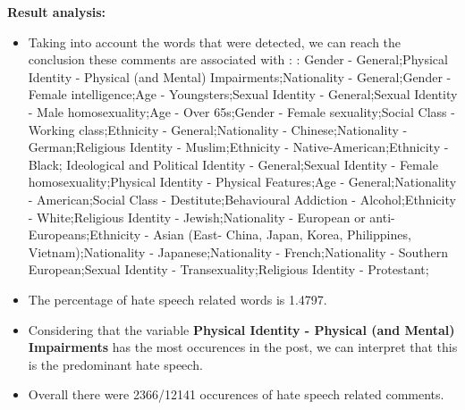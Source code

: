 \documentclass[11pt]{article}
\begin{document}
\textbf{\Large Result analysis:}

\begin{itemize}\item Taking into account the words that were detected, we can reach the conclusion these comments are associated with : : Gender - General;Physical Identity - Physical (and Mental) Impairments;Nationality - General;Gender - Female intelligence;Age - Youngsters;Sexual Identity - General;Sexual Identity - Male homosexuality;Age - Over 65s;Gender - Female sexuality;Social Class - Working class;Ethnicity - General;Nationality - Chinese;Nationality - German;Religious Identity - Muslim;Ethnicity - Native-American;Ethnicity - Black; Ideological and Political Identity - General;Sexual Identity - Female homosexuality;Physical Identity - Physical Features;Age - General;Nationality - American;Social Class - Destitute;Behavioural Addiction - Alcohol;Ethnicity - White;Religious Identity - Jewish;Nationality - European or anti-Europeans;Ethnicity - Asian (East- China, Japan, Korea, Philippines, Vietnam);Nationality - Japanese;Nationality - French;Nationality - Southern European;Sexual Identity - Transexuality;Religious Identity - Protestant;%

\item The percentage of hate speech related words is 1.4797.

\item Considering that the variable \textbf{Physical Identity - Physical (and Mental) Impairments} has the most occurences in the post, we can interpret that this is the predominant hate speech.

\item Overall there were 2366/12141 occurences of hate speech related comments.\end{itemize}
\end{document}
